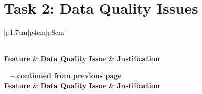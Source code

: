 \documentclass[11pt]{article}
\begin{document}
\section*{Task 2: Data Quality Issues}
\begin{longtable}{|p{1.7cm}|p{4cm}|p{8cm}|}
	\caption{Feature Quality Issues} \label{tab:feature_quality_issues} \\
	\hline
	\textbf{Feature} & \textbf{Data Quality Issue} & \textbf{Justification} \\
	\hline
	\endfirsthead
	
	{{\bfseries \tablename\ \thetable{} -- continued from previous page}} \\
	\hline
	\textbf{Feature} & \textbf{Data Quality Issue} & \textbf{Justification} \\
	\hline
	\endhead
	
	\hline {} \\ \hline
	\endfoot
	
	\hline 
	\endlastfoot
	

\end{longtable}
\end{document}
